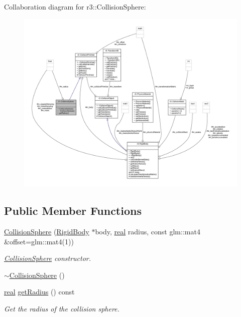 Collaboration diagram for r3\+:\+:Collision\+Sphere\+:\nopagebreak
\begin{figure}[H]
\begin{center}
\leavevmode
\includegraphics[width=350pt]{classr3_1_1_collision_sphere__coll__graph}
\end{center}
\end{figure}
\subsection*{Public Member Functions}
\begin{DoxyCompactItemize}
\item 
\mbox{\hyperlink{classr3_1_1_collision_sphere_a3b910b66d6b9689da9beba5ec151eba3}{Collision\+Sphere}} (\mbox{\hyperlink{classr3_1_1_rigid_body}{Rigid\+Body}} $\ast$body, \mbox{\hyperlink{namespacer3_ab2016b3e3f743fb735afce242f0dc1eb}{real}} radius, const glm\+::mat4 \&offset=glm\+::mat4(1))
\begin{DoxyCompactList}\small\item\em \mbox{\hyperlink{classr3_1_1_collision_sphere}{Collision\+Sphere}} constructor. \end{DoxyCompactList}\item 
\mbox{\hyperlink{classr3_1_1_collision_sphere_a3605a7afc888411c5fa52179122a8a77}{$\sim$\+Collision\+Sphere}} ()
\item 
\mbox{\hyperlink{namespacer3_ab2016b3e3f743fb735afce242f0dc1eb}{real}} \mbox{\hyperlink{classr3_1_1_collision_sphere_aa3b7687165b34ab82b3bedb0884cc65b}{get\+Radius}} () const
\begin{DoxyCompactList}\small\item\em Get the radius of the collision sphere. \end{DoxyCompactList}\end{DoxyCompactItemize}
